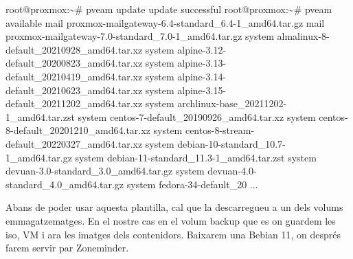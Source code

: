 \documentclass[
  10pt,
]{krantz}
\newenvironment{Shaded}{\begin{snugshade}}{\end{snugshade}}
\newcommand{\ExtensionTok}[1]{#1}
\newcommand{\NormalTok}[1]{#1}
\begin{document}
\begin{Shaded}
\begin{Highlighting}[]
\ExtensionTok{root@proxmox:\textasciitilde{}\#}\NormalTok{ pveam update}
\ExtensionTok{update}\NormalTok{ successful}
\ExtensionTok{root@proxmox:\textasciitilde{}\#}\NormalTok{ pveam available}
\ExtensionTok{mail}\NormalTok{            proxmox{-}mailgateway{-}6.4{-}standard\_6.4{-}1\_amd64.tar.gz}
\ExtensionTok{mail}\NormalTok{            proxmox{-}mailgateway{-}7.0{-}standard\_7.0{-}1\_amd64.tar.gz}
\ExtensionTok{system}\NormalTok{          almalinux{-}8{-}default\_20210928\_amd64.tar.xz}
\ExtensionTok{system}\NormalTok{          alpine{-}3.12{-}default\_20200823\_amd64.tar.xz}
\ExtensionTok{system}\NormalTok{          alpine{-}3.13{-}default\_20210419\_amd64.tar.xz}
\ExtensionTok{system}\NormalTok{          alpine{-}3.14{-}default\_20210623\_amd64.tar.xz}
\ExtensionTok{system}\NormalTok{          alpine{-}3.15{-}default\_20211202\_amd64.tar.xz}
\ExtensionTok{system}\NormalTok{          archlinux{-}base\_20211202{-}1\_amd64.tar.zst}
\ExtensionTok{system}\NormalTok{          centos{-}7{-}default\_20190926\_amd64.tar.xz}
\ExtensionTok{system}\NormalTok{          centos{-}8{-}default\_20201210\_amd64.tar.xz}
\ExtensionTok{system}\NormalTok{          centos{-}8{-}stream{-}default\_20220327\_amd64.tar.xz}
\ExtensionTok{system}\NormalTok{          debian{-}10{-}standard\_10.7{-}1\_amd64.tar.gz}
\ExtensionTok{system}\NormalTok{          debian{-}11{-}standard\_11.3{-}1\_amd64.tar.zst}
\ExtensionTok{system}\NormalTok{          devuan{-}3.0{-}standard\_3.0\_amd64.tar.gz}
\ExtensionTok{system}\NormalTok{          devuan{-}4.0{-}standard\_4.0\_amd64.tar.gz}
\ExtensionTok{system}\NormalTok{          fedora{-}34{-}default\_20}
\ExtensionTok{...}
\end{Highlighting}
\end{Shaded}

Abans de poder usar aquesta plantilla, cal que la descarregueu a un dels volums emmagatzematges. En el nostre cas en el volum backup que es on guardem les iso, VM i ara les imatges dels contenidors. Baixarem una Bebian 11, on després farem servir par Zoneminder.
\end{document}
